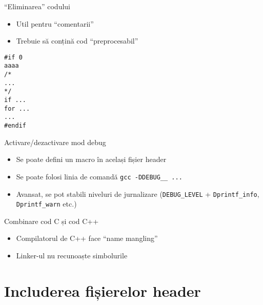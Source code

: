 \documentclass{beamer}
\begin{document}
\begin{frame}{``Eliminarea'' codului}
	\begin{itemize}
		\item Util pentru ``comentarii''
		\item Trebuie să conțină cod ``preprocesabil''
	\end{itemize}

	\begin{beamerboxesrounded}[lower=block body,shadow=true]{}
\texttt{\#if 0 \\
\hlstd{}\hlstd{\ \ \ \ \ \ \ \ }\hlstd{}aaaa \\
\hlstd{}\hlstd{\ \ \ \ \ \ \ \ }\hlstd{}/*  \\
\hlstd{}\hlstd{\ \ \ \ \ \ \ \ }\hlstd{}... \\
\hlstd{}\hlstd{\ \ \ \ \ \ \ \ }\hlstd{}*/ \\
\hlstd{}\hlstd{\ \ \ \ \ \ \ \ }\hlstd{}if ...\\
\hlstd{}\hlstd{\ \ \ \ \ \ \ \ }\hlstd{}for ...\\
\hlstd{}\hlstd{\ \ \ \ \ \ \ \ }\hlstd{}... \\
\#endif
}
	\end{beamerboxesrounded}

\end{frame}

\begin{frame}{Activare/dezactivare mod debug}
	
	\begin{itemize}
		\item Se poate defini un macro în același fișier header
		\item Se poate folosi linia de comandă \texttt{gcc -DDEBUG\_\_ ...}
		\item Avansat, se pot stabili niveluri de jurnalizare
(\texttt{DEBUG\_LEVEL} + \texttt{Dprintf\_info}, \texttt{Dprintf\_warn} etc.)
	\end{itemize}
\end{frame}

\begin{frame}{Combinare cod C și cod C++}
	\begin{itemize}
		\item Compilatorul de C++ face ``name mangling''
		\item Linker-ul nu recunoaște simbolurile
	\end{itemize}
	
\end{frame}

\section{Includerea fișierelor header}
\end{document}
